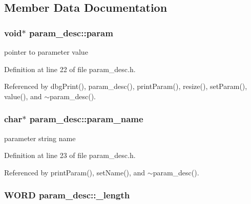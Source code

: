 \subsection{Member Data Documentation}
\hypertarget{classparam__desc_ab6c04ba17496b540d9e7c93e317bcc97}{
\subsubsection[{param}]{\setlength{\rightskip}{0pt plus 5cm}void$\ast$ {\bf param\_\-desc::param}}}
\label{d9/d42/classparam__desc_ab6c04ba17496b540d9e7c93e317bcc97}


pointer to parameter value 



Definition at line 22 of file param\_\-desc.h.



Referenced by dbgPrint(), param\_\-desc(), printParam(), resize(), setParam(), value(), and $\sim$param\_\-desc().

\hypertarget{classparam__desc_a23d2dc9553f6973dba3dd0f52695a25f}{
\subsubsection[{param\_\-name}]{\setlength{\rightskip}{0pt plus 5cm}char$\ast$ {\bf param\_\-desc::param\_\-name}}}
\label{d9/d42/classparam__desc_a23d2dc9553f6973dba3dd0f52695a25f}


parameter string name 



Definition at line 23 of file param\_\-desc.h.



Referenced by printParam(), setName(), and $\sim$param\_\-desc().

\hypertarget{classparam__desc_a165a9b9dcf1b25db8ddfba546569c1d6}{
\subsubsection[{\_\-length}]{\setlength{\rightskip}{0pt plus 5cm}WORD {\bf param\_\-desc::\_\-length}}}
\label{d9/d42/classparam__desc_a165a9b9dcf1b25db8ddfba546569c1d6}



